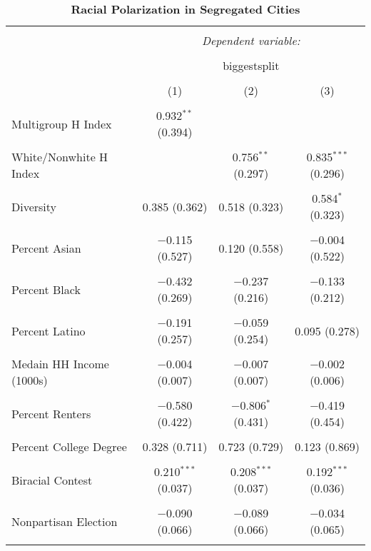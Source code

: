 \documentclass[]{article}
\begin{document}
\begin{table}[!htbp] \centering 
  \caption{\textbf{Racial Polarization in Segregated Cities}} 
  \label{} 
\begin{tabular}{@{\extracolsep{5pt}}lccc} 
\\[-1.8ex]\hline 
\hline \\[-1.8ex] 
 & \multicolumn{3}{c}{\textit{Dependent variable:}} \\ 
\cline{2-4} 
\\[-1.8ex] & \multicolumn{3}{c}{biggestsplit} \\ 
\\[-1.8ex] & (1) & (2) & (3)\\ 
\hline \\[-1.8ex] 
 Multigroup H Index & 0.932$^{**}$ (0.394) &  &  \\ 
  & & & \\ 
 White/Nonwhite H Index &  & 0.756$^{**}$ (0.297) & 0.835$^{***}$ (0.296) \\ 
  & & & \\ 
 Diversity & 0.385 (0.362) & 0.518 (0.323) & 0.584$^{*}$ (0.323) \\ 
  & & & \\ 
 Percent Asian & $-$0.115 (0.527) & 0.120 (0.558) & $-$0.004 (0.522) \\ 
  & & & \\ 
 Percent Black & $-$0.432 (0.269) & $-$0.237 (0.216) & $-$0.133 (0.212) \\ 
  & & & \\ 
 Percent Latino & $-$0.191 (0.257) & $-$0.059 (0.254) & 0.095 (0.278) \\ 
  & & & \\ 
 Medain HH Income (1000s) & $-$0.004 (0.007) & $-$0.007 (0.007) & $-$0.002 (0.006) \\ 
  & & & \\ 
 Percent Renters & $-$0.580 (0.422) & $-$0.806$^{*}$ (0.431) & $-$0.419 (0.454) \\ 
  & & & \\ 
 Percent College Degree & 0.328 (0.711) & 0.723 (0.729) & 0.123 (0.869) \\ 
  & & & \\ 
 Biracial Contest & 0.210$^{***}$ (0.037) & 0.208$^{***}$ (0.037) & 0.192$^{***}$ (0.036) \\ 
  & & & \\ 
 Nonpartisan Election & $-$0.090 (0.066) & $-$0.089 (0.066) & $-$0.034 (0.065) \\ 
  & & & \\ 

\end{tabular}
\end{table}
\end{document}
